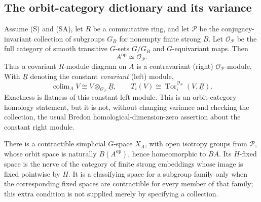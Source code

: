 \subsection{The orbit-category dictionary and its variance}

\begin{theorem}\label{B:orbit-dictionary}
Assume (S) and (SA), let $R$ be a commutative ring, and let $\mathcal P$ be the conjugacy-invariant
collection of subgroups $G_B$ for nonempty finite strong $B$.
Let $\mathcal O_{\mathcal P}$ be the full category of smooth
transitive $G$-sets $G/G_B$ and $G$-equivariant maps. Then
\[
 A^{\mathrm{op}}\simeq\mathcal O_{\mathcal P}.
\]
Thus a covariant $R$-module diagram on $A$ is a contravariant
(right) $\mathcal O_{\mathcal P}$-module. With $\underline R$
denoting the constant \emph{covariant} (left) module,
\[
 \operatorname{colim}_A V
 \cong V\otimes_{\mathcal O_{\mathcal P}}\underline R,\qquad
 T_i(V)\cong
 \operatorname{Tor}^{\mathcal O_{\mathcal P}}_i
       (V,\underline R).
\]
Exactness is flatness of this constant left module. This is an
orbit-category homology statement, but it is not, without changing
variance and checking the collection, the usual Bredon
homological-dimension-zero assertion about the constant right
module.

There is a contractible simplicial $G$-space $X_A$, with open
isotropy groups from $\mathcal P$, whose orbit space is naturally
$B(A^{\mathrm{op}})$, hence homeomorphic to $BA$. Its $H$-fixed
space is the nerve of the category of finite strong embeddings
whose image is fixed pointwise by $H$. It is a classifying space
for a subgroup family only when the corresponding fixed spaces
are contractible for every member of that family; this extra
condition is not supplied merely by specifying a collection.
\end{theorem}
